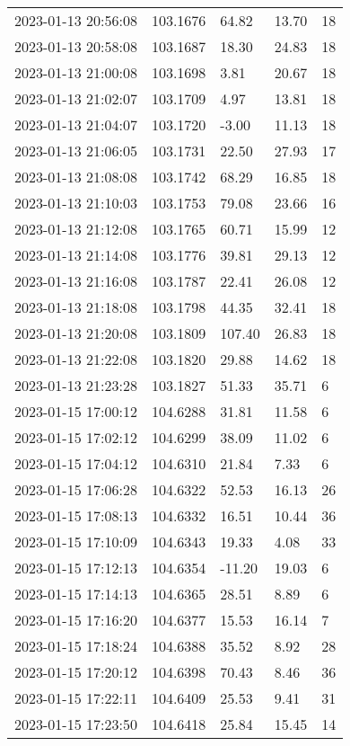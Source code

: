 \documentclass{nature_plusfigure}
\begin{document}
\begin{supplement}
\begin{center}
\begin{longtable}{lllll}
2023-01-13 20:56:08 & 103.1676 & 64.82 & 13.70 & 18 \\ 
2023-01-13 20:58:08 & 103.1687 & 18.30 & 24.83 & 18 \\ 
2023-01-13 21:00:08 & 103.1698 & 3.81 & 20.67 & 18 \\ 
2023-01-13 21:02:07 & 103.1709 & 4.97 & 13.81 & 18 \\ 
2023-01-13 21:04:07 & 103.1720 & -3.00 & 11.13 & 18 \\ 
2023-01-13 21:06:05 & 103.1731 & 22.50 & 27.93 & 17 \\ 
2023-01-13 21:08:08 & 103.1742 & 68.29 & 16.85 & 18 \\ 
2023-01-13 21:10:03 & 103.1753 & 79.08 & 23.66 & 16 \\ 
2023-01-13 21:12:08 & 103.1765 & 60.71 & 15.99 & 12 \\ 
2023-01-13 21:14:08 & 103.1776 & 39.81 & 29.13 & 12 \\ 
2023-01-13 21:16:08 & 103.1787 & 22.41 & 26.08 & 12 \\ 
2023-01-13 21:18:08 & 103.1798 & 44.35 & 32.41 & 18 \\ 
2023-01-13 21:20:08 & 103.1809 & 107.40 & 26.83 & 18 \\ 
2023-01-13 21:22:08 & 103.1820 & 29.88 & 14.62 & 18 \\ 
2023-01-13 21:23:28 & 103.1827 & 51.33 & 35.71 & 6 \\ 
2023-01-15 17:00:12 & 104.6288 & 31.81 & 11.58 & 6 \\ 
2023-01-15 17:02:12 & 104.6299 & 38.09 & 11.02 & 6 \\ 
2023-01-15 17:04:12 & 104.6310 & 21.84 & 7.33 & 6 \\ 
2023-01-15 17:06:28 & 104.6322 & 52.53 & 16.13 & 26 \\ 
2023-01-15 17:08:13 & 104.6332 & 16.51 & 10.44 & 36 \\ 
2023-01-15 17:10:09 & 104.6343 & 19.33 & 4.08 & 33 \\ 
2023-01-15 17:12:13 & 104.6354 & -11.20 & 19.03 & 6 \\ 
2023-01-15 17:14:13 & 104.6365 & 28.51 & 8.89 & 6 \\ 
2023-01-15 17:16:20 & 104.6377 & 15.53 & 16.14 & 7 \\ 
2023-01-15 17:18:24 & 104.6388 & 35.52 & 8.92 & 28 \\ 
2023-01-15 17:20:12 & 104.6398 & 70.43 & 8.46 & 36 \\ 
2023-01-15 17:22:11 & 104.6409 & 25.53 & 9.41 & 31 \\ 
2023-01-15 17:23:50 & 104.6418 & 25.84 & 15.45 & 14 \\ 

\end{longtable}
\end{center}
\end{supplement}
\end{document}
